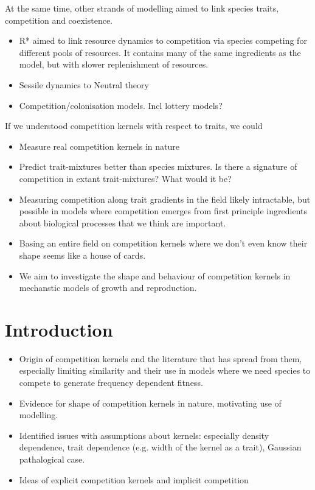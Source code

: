 \documentclass[a4paper,11pt]{article}
\begin{document}
At the same time, other strands of modelling aimed to link species
traits, competition and coexistence.
\begin{itemize}
\item R* \citep{Tilman-1980,Tilman-1982} aimed to link resource
  dynamics to competition via species competing for different pools of
  resources.  It contains many of the same ingredients as the
  \citet{MacArthur-1967} model, but with slower replenishment of
  resources.
\item Sessile dynamics to Neutral theory
\item Competition/colonisation models.  Incl lottery models?
\end{itemize}

If we understood competition kernels with respect to traits, we could
\begin{itemize}
\item Measure real competition kernels in nature
\item Predict trait-mixtures better than species mixtures.  Is there a
  signature of competition in extant trait-mixtures?  What would it
  be?
\item Measuring competition along trait gradients in the field likely
  intractable, but possible in models where competition emerges from
  first principle ingredients about biological processes that we think
  are important.
\item Basing an entire field on competition kernels where we don't
  even know their shape seems like a house of cards.
\item We aim to investigate the shape and behaviour of competition
  kernels in mechanstic models of growth and reproduction.
\end{itemize}

\section{Introduction}

\begin{itemize}
\item Origin of competition kernels and the literature that has spread
  from them, especially limiting similarity and their use in models
  where we need species to compete to generate frequency dependent
  fitness.
\item Evidence for shape of competition kernels in nature, motivating
  use of modelling.
\item Identified issues with assumptions about kernels: especially
  density dependence, trait dependence (e.g. width of the kernel as a
  trait), Gaussian pathalogical case.
\item Ideas of explicit competition kernels and implicit competition
\end{itemize}
\end{document}
